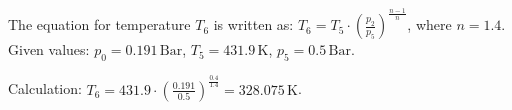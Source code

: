 The equation for temperature \( T_6 \) is written as:  
\( T_6 = T_5 \cdot \left( \frac{p_2}{p_5} \right)^{\frac{n-1}{n}} \), where \( n = 1.4 \).  
Given values:  
\( p_0 = 0.191 \, \text{Bar} \), \( T_5 = 431.9 \, \text{K} \), \( p_5 = 0.5 \, \text{Bar} \).  

Calculation:  
\( T_6 = 431.9 \cdot \left( \frac{0.191}{0.5} \right)^{\frac{0.4}{1.4}} = 328.075 \, \text{K} \).